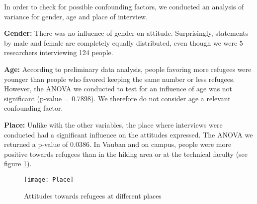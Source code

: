 In order to check for possible confounding factors, we conducted an analysis of variance for gender, age and place of interview.

\textbf{Gender:} There was no influence of gender on attitude. Surprisingly, statements by male and female are completely equally distributed, even though we were 5 researchers interviewing 124 people. 

\textbf{Age:} According to preliminary data analysis, people favoring more refugees were younger than people who favored keeping the same number or less refugees. However, the ANOVA we conducted to test for an influence of age was not significant (p-value = 0.7898). We therefore do not consider age a relevant confounding factor.

\textbf{Place:} Unlike with the other variables, the place where interviews were conducted had a significant influence on the attitudes expressed. The ANOVA we returned a p-value of 0.0386.
In Vauban and on campus, people were more positive towards refugees than in the hiking area or at the technical faculty (see figure \ref{fig: Place}).

\begin{figure}
	\centering 
	\texttt{[image: Place]}
	\caption{Attitudes towards refugees at different places}\label{fig: Place}
\end{figure}
